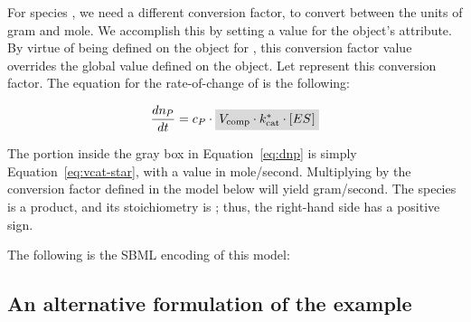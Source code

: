 For species , we need a different conversion factor, to
convert between the units of \unit{gram} and \unit{mole}.  We
accomplish this by setting a value for the \Species object's
 attribute.  By virtue of being defined on
the \Species object for , this conversion factor value
overrides the global value defined on the \Model object.  Let
\convP represent this conversion factor.  The equation for the
rate-of-change of  is the following:
\begin{linenomath}
  \begin{equation}\label{eq:dnp}
    \dfrac{d \nP}{d t} = \convP \cdot \graybox{$\Vcomp \cdot \kcatnew \cdot \concent{ES}$}
  \end{equation}
\end{linenomath}
The portion inside the gray box in Equation~\ref{eq:dnp} is simply
Equation~\ref{eq:vcat-star}, with a value in mole/second.
Multiplying by the conversion factor  defined
in the model below will yield gram/second.  The species
 is a product, and its stoichiometry is ; thus,
the right-hand side has a positive sign.

The following is the SBML encoding of this model:



\subsection{An alternative formulation of the  example}
\label{sec:eg:conversionfactor2}

